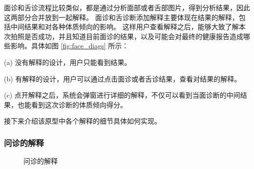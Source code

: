 面诊和舌诊流程比较类似，都是通过分析面部或者舌部图片，得到分析结果，因此这两部分合并放到一起解释。
面诊和舌诊断添加解释主要体现在结果的解释，包括中间结果和对各种体质倾向的影响。
这样用户查看解释之后，能够大致了解本次拍照是否成功，并且知道目前面诊的结果，以及可能会对最终的健康报告造成哪些影响。具体如图 \ref{fig:face_diags} 所示：

(a) 没有解释的设计，用户只能看到结果。

(b) 有解释的设计，用户可以通过点击面诊或者舌诊结果，查看对结果的解释。

(c) 点开解释之后，系统会弹窗进行详细的解释，不仅可以看到当面诊断的中间结果，也能看到这次诊断的体质倾向得分。

接下来介绍该原型中各个解释的细节具体如何实现。


\subsubsection{问诊的解释}

\begin{figure}[h]
    \centering
    \caption{问诊的解释}
    \label{fig:questions}
\end{figure}

